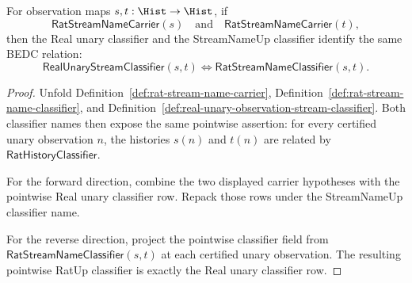 \begin{theorem}
\label{thm:real-unary-streamname-classifier-exactness}
For observation maps $s,t:\Hist\to\Hist$, if
$$
\mathsf{RatStreamNameCarrier}(s)
\quad\text{and}\quad
\mathsf{RatStreamNameCarrier}(t),
$$
then the Real unary classifier and the StreamNameUp classifier identify the same
BEDC relation:
$$
\mathsf{RealUnaryStreamClassifier}(s,t)
\Longleftrightarrow
\mathsf{RatStreamNameClassifier}(s,t).
$$
\end{theorem}
\begin{proof}
Unfold Definition~\ref{def:rat-stream-name-carrier},
Definition~\ref{def:rat-stream-name-classifier}, and
Definition~\ref{def:real-unary-observation-stream-classifier}. Both classifier
names then expose the same pointwise assertion: for every certified unary
observation $n$, the histories $s(n)$ and $t(n)$ are related by
$\mathsf{RatHistoryClassifier}$.

For the forward direction, combine the two displayed carrier hypotheses with
the pointwise Real unary classifier row. Repack those rows under the
StreamNameUp classifier name.

For the reverse direction, project the pointwise classifier field from
$\mathsf{RatStreamNameClassifier}(s,t)$ at each certified unary observation.
The resulting pointwise RatUp classifier is exactly the Real unary classifier
row.
\end{proof}


